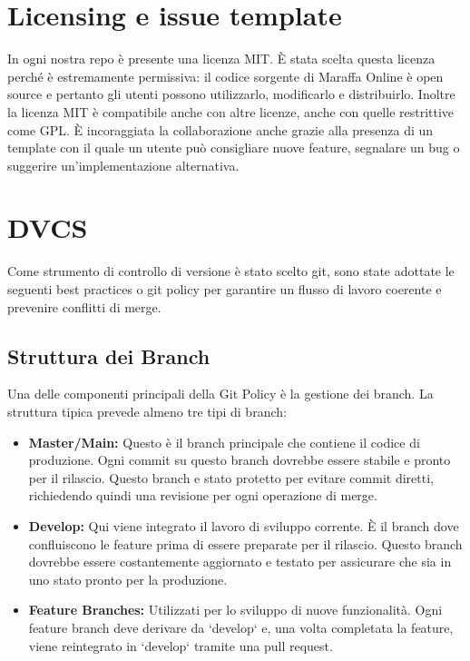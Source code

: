 \section{Licensing e issue template}
In ogni nostra repo è presente una licenza MIT. È stata scelta questa licenza perché è estremamente permissiva: 
il codice sorgente di Maraffa Online è open source e pertanto gli utenti possono utilizzarlo, modificarlo e distribuirlo.
Inoltre la licenza MIT è compatibile anche con altre licenze, anche con quelle restrittive come GPL.
È incoraggiata la collaborazione anche grazie alla presenza di un template con il quale un utente può consigliare nuove feature,
 segnalare un bug o suggerire un'implementazione alternativa.
\section{DVCS}

Come strumento di controllo di versione è stato scelto git, sono state adottate le seguenti best practices o git policy per garantire un flusso di lavoro coerente e prevenire conflitti di merge.

\subsection{Struttura dei Branch}

Una delle componenti principali della Git Policy è la gestione dei branch. La struttura tipica prevede almeno tre tipi di branch:
\begin{itemize}
 \item \textbf{Master/Main:} Questo è il branch principale che contiene il codice di produzione. Ogni commit su questo branch dovrebbe essere stabile e pronto per il rilascio. Questo branch e stato protetto per evitare commit diretti, richiedendo quindi una revisione per ogni operazione di merge.
 \item \textbf{Develop:} Qui viene integrato il lavoro di sviluppo corrente. È il branch dove confluiscono le feature prima di essere preparate per il rilascio. Questo branch dovrebbe essere costantemente aggiornato e testato per assicurare che sia in uno stato pronto per la produzione.
 \item \textbf{Feature Branches:} Utilizzati per lo sviluppo di nuove funzionalità. Ogni feature branch deve derivare da `develop` e, una volta completata la feature, viene reintegrato in `develop` tramite una pull request.
\end{itemize}


